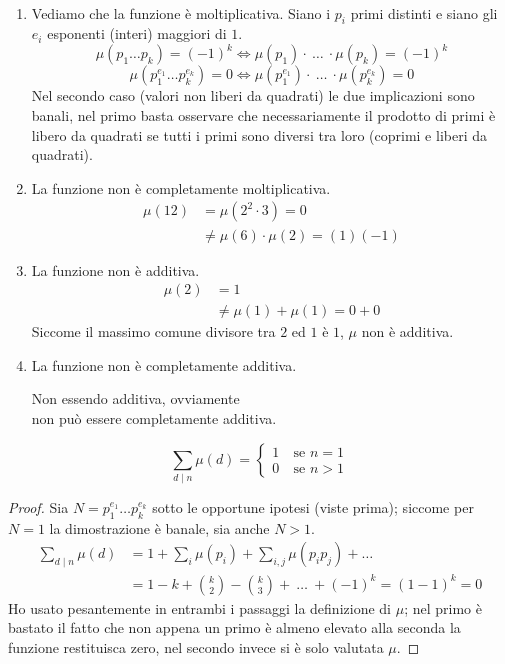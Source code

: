 \begin{osservazione}[Proprietà] \
	\begin{enumerate}
		\item Vediamo che la funzione è moltiplicativa. Siano i $p_i$ primi distinti e siano gli $e_i$ esponenti (interi) maggiori di $1$.
		\begin{equation*}
		\mu(p_1\dots p_k)=(-1)^k \iff \mu(p_1)\cdot \ \dots \ \cdot \mu(p_k)=(-1)^k
		\end{equation*}
		\begin{equation*}
		\mu(p_1^{e_1}\dots p_k^{e_k})=0 \iff \mu(p_1^{e_1})\cdot \ \dots \ \cdot \mu(p_k^{e_k})=0
		\end{equation*}
		Nel secondo caso (valori non liberi da quadrati) le due implicazioni sono banali, nel primo basta osservare che necessariamente il prodotto di primi è libero da quadrati se tutti i primi sono diversi tra loro (coprimi e liberi da quadrati).
		\item La funzione non è completamente moltiplicativa.
		\begin{align*}
		\mu(12)&=\mu(2^2\cdot3)=0\\ &\neq \mu(6)\cdot \mu(2)=(1)(-1)
		\end{align*}
		\item La funzione non è additiva.
		\begin{align*}
		\mu(2)&=1\\
		&\neq \mu(1)+\mu(1)=0+0
		\end{align*}
		Siccome il massimo comune divisore tra $2$ ed $1$ è $1$, $\mu$ non è additiva.
		\item La funzione non è completamente additiva. 
		\begin{center}
			Non essendo additiva, ovviamente \\ non può essere completamente additiva.
		\end{center}
		
	\end{enumerate}
\end{osservazione}
\begin{proposizione}
	\label{somma_moebius}
	\begin{equation*}
	\sum_{d\mid n}\mu(d)=
	\begin{cases}
	1 \ & \text{se $n=1$}\\
	0 \ & \text{se $n>1$}
	\end{cases}
	\end{equation*}
\end{proposizione}
\begin{proof} 
	Sia $N=p_1^{e_1}\dots p_k^{e_k}$ sotto le opportune ipotesi (viste prima); siccome per $N=1$ la dimostrazione è banale, sia anche $N>1$.
	\begin{align*}
	\sum_{d\mid n}\mu(d)&=1+\sum_i\mu(p_i)+\sum_{i,j}\mu(p_ip_j)+\dots\\
	&= 1-k+\binom{k}{2}-\binom{k}{3}+\ \dots \ +(-1)^k=(1-1)^k=0
	\end{align*}
	Ho usato pesantemente in entrambi i passaggi la definizione di $\mu$; nel primo è bastato il fatto che non appena un primo è almeno elevato alla seconda la funzione restituisca zero, nel secondo invece si è solo valutata $\mu$.
\end{proof}
